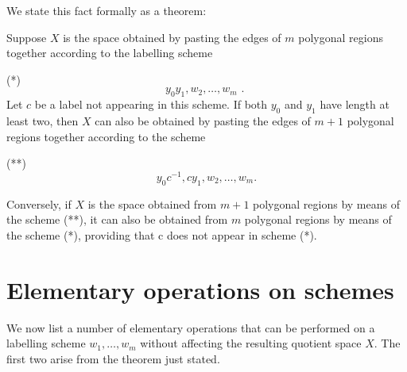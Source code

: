 We state this fact formally as a theorem:

\begin{theorem}
\label{thm:\thetheorem}
	Suppose \(X\) is the space obtained by pasting the edges of \(m\) polygonal regions together according to the labelling scheme

(*)
\[
y_{0}y_{1},w_{2},\ldots ,w_{m}\text{ . }
\]
Let \(c\) be a label not appearing in this scheme. If both \(y_{0}\) and \(y_{1}\) have length at least two, then \(X\) can also be obtained by pasting the edges of \(m + 1\) polygonal regions together according to the scheme

(**)
\[
y_{0}c^{-1},cy_{1},w_{2},\ldots ,w_{m}.
\]

Conversely, if \(X\) is the space obtained from \(m + 1\) polygonal regions by means of the scheme (**), it can also be obtained from \(m\) polygonal regions by means of the scheme (*), providing that c does not appear in scheme (*).
\end{theorem}

\section*{Elementary operations on schemes}

We now list a number of elementary operations that can be performed on a labelling scheme \(w_{1},\ldots ,w_{m}\) without affecting the resulting quotient space \(X\). The first two arise from the theorem just stated.

